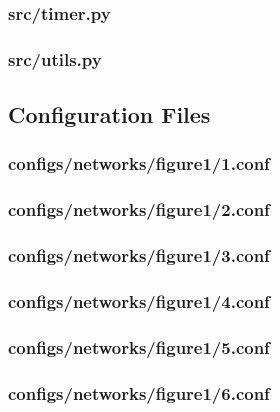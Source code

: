 \documentclass[11pt]{article} %
\begin{document}
\subsubsection{src/timer.py}


\subsubsection{src/utils.py}


\newpage
\subsection{Configuration Files}

\subsubsection{configs/networks/figure1/1.conf} \label{figure1-start}


\subsubsection{configs/networks/figure1/2.conf}


\subsubsection{configs/networks/figure1/3.conf}


\subsubsection{configs/networks/figure1/4.conf}


\subsubsection{configs/networks/figure1/5.conf}


\subsubsection{configs/networks/figure1/6.conf}

\end{document}
